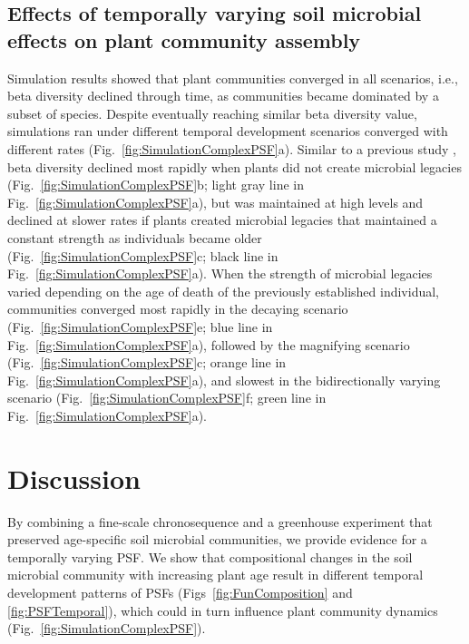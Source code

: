 \subsection*{Effects of temporally varying soil microbial effects on plant community assembly}
Simulation results showed that plant communities converged in all scenarios, i.e., beta diversity declined through time, as communities became dominated by a subset of species. Despite eventually reaching similar beta diversity value, simulations ran under different temporal development scenarios converged with different rates (Fig.~\ref{fig:SimulationComplexPSF}a). Similar to a previous study \citep{Fukami2013}, beta diversity declined most rapidly when plants did not create microbial legacies (Fig.~\ref{fig:SimulationComplexPSF}b; light gray line in Fig.~\ref{fig:SimulationComplexPSF}a), but was maintained at high levels and declined at slower rates if plants created microbial legacies that maintained a constant strength as individuals became older (Fig.~\ref{fig:SimulationComplexPSF}c; black line in Fig.~\ref{fig:SimulationComplexPSF}a).
When the strength of microbial legacies varied depending on the age of death of the previously established individual, communities converged most rapidly in the decaying scenario (Fig.~\ref{fig:SimulationComplexPSF}e; blue line in Fig.~\ref{fig:SimulationComplexPSF}a), followed by the magnifying scenario (Fig.~\ref{fig:SimulationComplexPSF}c; orange line in Fig.~\ref{fig:SimulationComplexPSF}a), and slowest in the bidirectionally varying scenario (Fig.~\ref{fig:SimulationComplexPSF}f; green line in Fig.~\ref{fig:SimulationComplexPSF}a).
\par



\section{Discussion}
By combining a fine-scale chronosequence and a greenhouse experiment that preserved age-specific soil microbial communities, we provide evidence for a temporally varying PSF. 
We show that compositional changes in the soil microbial community with increasing plant age result in different temporal development patterns of PSFs (Figs~\ref{fig:FunComposition} and \ref{fig:PSFTemporal}), which could in turn influence plant community dynamics (Fig.~\ref{fig:SimulationComplexPSF}). 
\par



